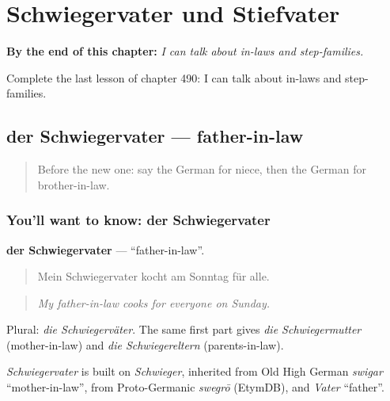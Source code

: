 
\chapter{Schwiegervater und Stiefvater}
\label{ch:ge-schwiegervater-und-stiefvater}

\begin{chapteropening}
\textbf{By the end of this chapter:} \emph{I can talk about in-laws and step-families.}

Complete the last lesson of chapter 490: I can talk about in-laws and step-families.
\end{chapteropening}

\section[der Schwiegervater]{der Schwiegervater — father-in-law}

\label{lesson:GE-C490-schwiegervater}



\begin{quote}
Before the new one: say the German for niece, then the German for brother-in-law.
\end{quote}

\subsection*{You'll want to know: der Schwiegervater}
\textbf{der Schwiegervater} — \textquotedblleft{}father-in-law\textquotedblright{}.

\begin{quote}
Mein Schwiegervater kocht am Sonntag für alle.
\end{quote}

\begin{quote}
\emph{My father-in-law cooks for everyone on Sunday.}
\end{quote}

Plural: \emph{die Schwiegerväter}. The same first part gives \emph{die Schwiegermutter} (mother-in-law) and \emph{die Schwiegereltern} (parents-in-law).

\begin{cousinweb}
\emph{Schwiegervater} is built on \emph{Schwieger}, inherited from Old High German \emph{swigar} \textquotedblleft{}mother-in-law\textquotedblright{}, from Proto-Germanic \emph{swegrō} (EtymDB), and \emph{Vater} \textquotedblleft{}father\textquotedblright{}.
\end{cousinweb}

